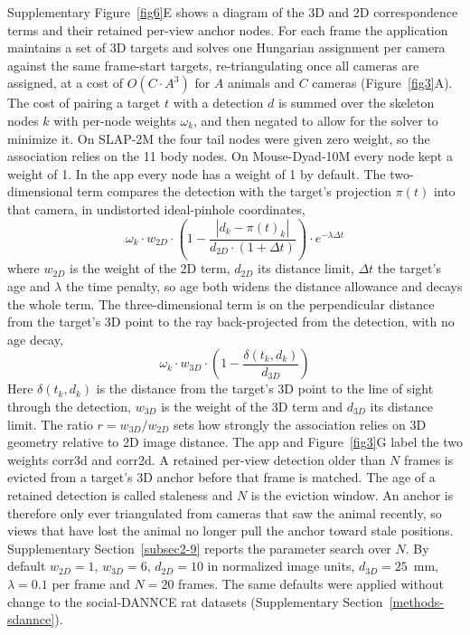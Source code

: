 \documentclass[pdflatex, sn-nature]{sn-jnl}
\theoremstyle{thmstyleone}%
\theoremstyle{thmstyletwo}%
\theoremstyle{thmstylethree}%
\begin{document}
Supplementary Figure~\ref{fig6}E shows a diagram of the 3D and 2D correspondence terms and their retained per-view anchor nodes. For each frame the application maintains a set of 3D targets and solves one Hungarian assignment per camera against the same frame-start targets, re-triangulating once all cameras are assigned, at a cost of $O(C \cdot A^3)$ for $A$ animals and $C$ cameras (Figure~\ref{fig3}A). The cost of pairing a target $t$ with a detection $d$ is summed over the skeleton nodes $k$ with per-node weights $\omega_k$, and then negated to allow for the solver to minimize it. On SLAP-2M the four tail nodes were given zero weight, so the association relies on the 11 body nodes. On Mouse-Dyad-10M every node kept a weight of 1. In the app every node has a weight of 1 by default. The two-dimensional term compares the detection with the target's projection $\pi(t)$ into that camera, in undistorted ideal-pinhole coordinates,
\[
  \omega_k \cdot w_{2D} \cdot \left(1 - \frac{|d_k - \pi(t)_k|}{d_{2D} \cdot (1 + \Delta t)}\right) \cdot e^{-\lambda \Delta t}
\]
where $w_{2D}$ is the weight of the 2D term, $d_{2D}$ its distance limit, $\Delta t$ the target's age and $\lambda$ the time penalty, so age both widens the distance allowance and decays the whole term. The three-dimensional term is on the perpendicular distance from the target's 3D point to the ray back-projected from the detection, with no age decay,
\[
  \omega_k \cdot w_{3D} \cdot \left(1 - \frac{\delta(t_k, d_k)}{d_{3D}}\right)
\]
Here $\delta(t_k, d_k)$ is the distance from the target's 3D point to the line of sight through the detection, $w_{3D}$ is the weight of the 3D term and $d_{3D}$ its distance limit. The ratio $r = w_{3D}/w_{2D}$ sets how strongly the association relies on 3D geometry relative to 2D image distance. The app and Figure~\ref{fig3}G label the two weights corr3d and corr2d. A retained per-view detection older than $N$ frames is evicted from a target's 3D anchor before that frame is matched. The age of a retained detection is called staleness and $N$ is the eviction window. An anchor is therefore only ever triangulated from cameras that saw the animal recently, so views that have lost the animal no longer pull the anchor toward stale positions. Supplementary Section~\ref{subsec2-9} reports the parameter search over $N$. By default $w_{2D} = 1$, $w_{3D} = 6$, $d_{2D} = 10$ in normalized image units, $d_{3D} = 25$~mm, $\lambda = 0.1$ per frame and $N = 20$ frames. The same defaults were applied without change to the social-DANNCE rat datasets (Supplementary Section~\ref{methods-sdannce}).
 
\end{document}
